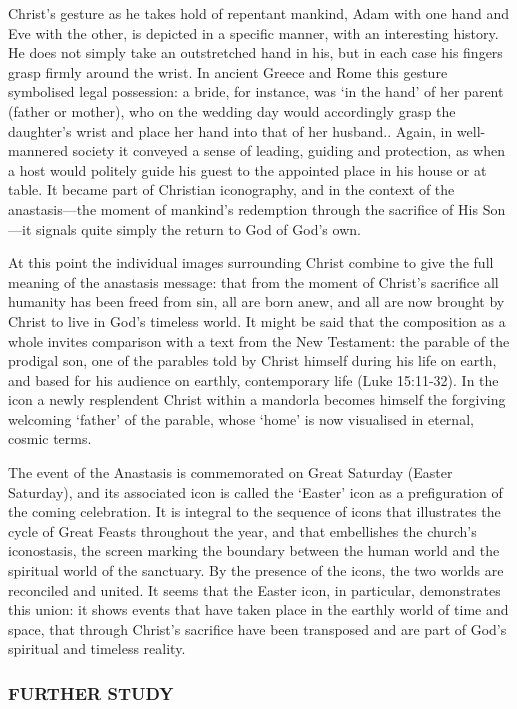 \documentclass[a4paper,12pt]{article}
\begin{document}
Christ’s gesture as he takes hold of repentant mankind, Adam with one
hand and Eve with the other, is depicted in a specific manner, with an
interesting history.  He does not simply take an outstretched hand in
his, but in each case his fingers grasp firmly around the wrist.  In
ancient Greece and Rome this gesture symbolised legal possession: a
bride, for instance, was ‘in the hand’ of her parent (father or
mother), who on the wedding day would accordingly grasp the daughter’s
wrist and place her hand into that of her husband..  Again, in
well-mannered society it conveyed a sense of leading, guiding and
protection, as when a host would politely guide his guest to the
appointed place in his house or at table.  It became part of Christian
iconography, and in the context of the anastasis---the moment of
mankind’s redemption through the sacrifice of His Son---it signals
quite simply the return to God of God’s own.

At this point the individual images surrounding Christ combine to give
the full meaning of the anastasis message: that from the moment of
Christ’s sacrifice all humanity has been freed from sin, all are born
anew, and all are now brought by Christ to live in God’s timeless
world.  It might be said that the composition as a whole invites
comparison with a text from the New Testament: the parable of the
prodigal son, one of the parables told by Christ himself during his
life on earth, and based for his audience on earthly, contemporary
life (Luke 15:11-32). In the icon a newly resplendent Christ within a
mandorla becomes himself the forgiving welcoming ‘father’ of the
parable, whose ‘home’ is now visualised in eternal, cosmic terms.

The event of the Anastasis is commemorated on Great Saturday (Easter
Saturday), and its associated icon is called the ‘Easter’ icon as a
prefiguration of the coming celebration.  It is integral to the
sequence of icons that illustrates the cycle of Great Feasts
throughout the year, and that embellishes the church’s iconostasis,
the screen marking the boundary between the human world and the
spiritual world of the sanctuary.  By the presence of the icons, the
two worlds are reconciled and united.  It seems that the Easter icon,
in particular, demonstrates this union: it shows events that have
taken place in the earthly world of time and space, that through
Christ’s sacrifice have been transposed and are part of God’s
spiritual and timeless reality.

\subsubsection*{FURTHER STUDY}
\end{document}
